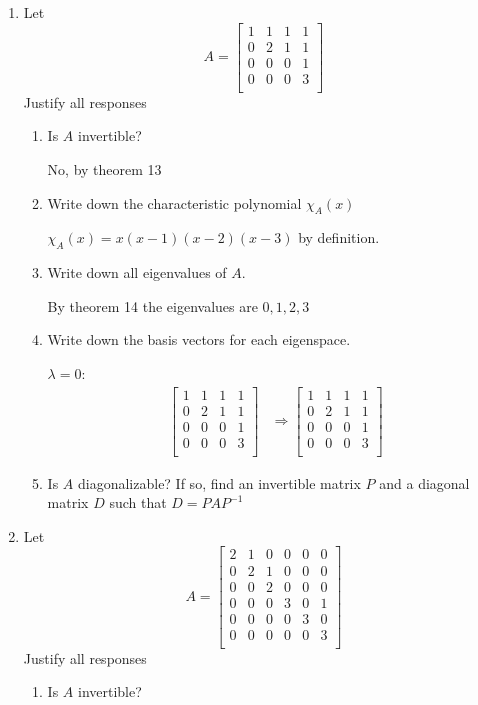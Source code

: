 \documentclass[letterpaper]{article}
\begin{document}
\begin{enumerate}
\item
Let 
\[A=\left[\begin{array}{rrrr}
1&1&1&1\\
0&2&1&1\\
0&0&0&1\\
0&0&0&3\\
\end{array}\right]\]
Justify all responses
  \begin{enumerate}
  \item
  Is $A$ invertible?

  No, by theorem 13
  \item
  Write down the characteristic polynomial $\chi_A(x)$

  $\chi_A(x)=x(x-1)(x-2)(x-3)$ by definition.
  \item
  Write down all eigenvalues of $A$.

  By theorem 14 the eigenvalues are $0,1,2,3$
  \item
  Write down the basis vectors for each eigenspace.

  $\lambda=0$:
  \begin{align*}
    \left[\begin{array}{rrrr}
    1&1&1&1\\
    0&2&1&1\\
    0&0&0&1\\
    0&0&0&3\\
    \end{array}\right] 
    &\Rightarrow
    \left[\begin{array}{rrrr}
    1&1&1&1\\
    0&2&1&1\\
    0&0&0&1\\
    0&0&0&3\\
    \end{array}\right]   \end{align*}
  \item
  Is $A$ diagonalizable? If so, find an invertible matrix $P$ and a diagonal matrix $D$ such that $D=PAP^{-1}$
  \end{enumerate}
\item
Let 
\[A=\left[\begin{array}{rrrrrr}
2&1&0&0&0&0\\
0&2&1&0&0&0\\
0&0&2&0&0&0\\
0&0&0&3&0&1\\
0&0&0&0&3&0\\
0&0&0&0&0&3\\
\end{array}\right]\]
Justify all responses
  \begin{enumerate}
  \item
  Is $A$ invertible?


\end{enumerate}
\end{enumerate}
\end{document}
